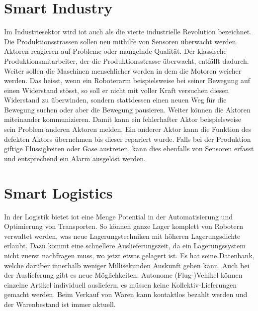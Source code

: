 \section{Smart Industry}
Im Industriesektor wird \gls{iot} auch als die vierte industrielle Revolution bezeichnet. Die Produktionsstrassen sollen neu mithilfe von Sensoren überwacht werden. Aktoren reagieren auf Probleme oder mangelnde Qualität. Der klassische Produktionsmitarbeiter, der die Produktionsstrasse überwacht, entfällt dadurch. Weiter sollen die Maschinen menschlicher werden in dem die Motoren \glqq{}weicher\grqq{} werden. Das heisst, wenn ein Roboterarm beispielsweise bei seiner Bewegung auf einen Widerstand stösst, so soll er nicht mit voller Kraft versuchen diesen Widerstand zu überwinden, sondern stattdessen einen neuen Weg für die Bewegung suchen oder aber die Bewegung pausieren. Weiter können die Aktoren miteinander kommunizieren. Damit kann ein fehlerhafter Aktor beispielsweise sein Problem anderen Aktoren melden. Ein anderer Aktor kann die Funktion des defekten Aktors übernehmen bis dieser repariert wurde. Falls bei der Produktion giftige Flüssigkeiten oder Gase austreten, kann dies ebenfalls von Sensoren erfasst und entsprechend ein Alarm ausgelöst werden.

\section{Smart Logistics}
In der Logistik bietet \gls{iot} eine Menge Potential in der Automatisierung und Optimierung von Transporten. So können ganze Lager komplett von Robotern verwaltet werden, was neue Lagerungstechniken mit höheren Lagerungsdichte erlaubt. Dazu kommt eine schnellere Auslieferungszeit, da ein Lagerungssystem nicht zuerst nachfragen muss, wo jetzt etwas gelagert ist. Es hat seine Datenbank, welche darüber innerhalb weniger Millisekunden Auskunft geben kann. Auch bei der Auslieferung gibt es neue Möglichkeiten: Autonome (Flug-)Vehikel können einzelne Artikel individuell ausliefern, es müssen keine Kollektiv-Lieferungen gemacht werden. Beim Verkauf von Waren kann kontaktlos bezahlt werden und der Warenbestand ist immer aktuell.

